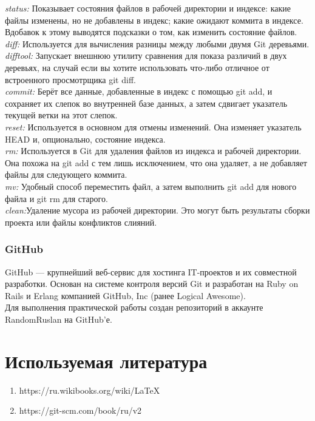 \documentclass{article}
\begin{document}
		\textit{status:} Показывает состояния файлов в рабочей директории и индексе: какие файлы изменены, но не добавлены в индекс; какие ожидают коммита в индексе. Вдобавок к этому выводятся подсказки о том, как изменить состояние файлов.\\
		
		\textit{diff:} Используется для вычисления разницы между любыми двумя Git деревьями.\\ 
		
		\textit{difftool:} Запускает внешнюю утилиту сравнения для показа различий в двух деревьях, на случай если вы хотите использовать что-либо отличное от встроенного просмотрщика git diff.\\
		
		\textit{commit:} Берёт все данные, добавленные в индекс с помощью git add, и сохраняет их слепок во внутренней базе данных, а затем сдвигает указатель текущей ветки на этот слепок.\\
		
		\textit{reset:} Используется в основном для отмены изменений. Она изменяет указатель HEAD и, опционально, состояние индекса.\\
		
		\textit{rm:} Используется в Git для удаления файлов из индекса и рабочей директории. Она похожа на git add с тем лишь исключением, что она удаляет, а не добавляет файлы для следующего коммита.\\
		
		\textit{mv:} Удобный способ переместить файл, а затем выполнить git add для нового файла и git rm для старого.\\
		
		\textit{clean:}Удаление мусора из рабочей директории. Это могут быть результаты сборки проекта или файлы конфликтов слияний.
		
		\subsubsection{GitHub}
		GitHub — крупнейший веб-сервис для хостинга IT-проектов и их совместной разработки. Основан на системе контроля версий Git и разработан на Ruby on Rails и Erlang компанией GitHub, Inc (ранее Logical Awesome).\\
		
		Для выполнения практической работы создан репозиторий в аккаунте RandomRuslan на GitHub'е.\\
\newpage
	\section{Используемая литература}
		\begin{enumerate}
			\item https://ru.wikibooks.org/wiki/LaTeX
			\item https://git-scm.com/book/ru/v2
			
		\end{enumerate}
\end{document}

